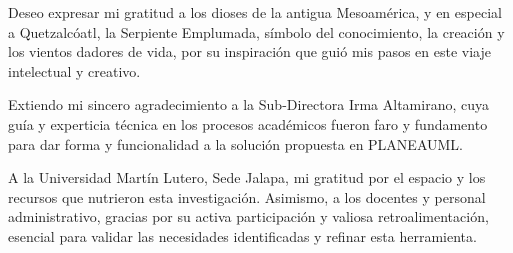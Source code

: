 
Deseo expresar mi gratitud a los dioses de la antigua Mesoamérica, y en especial a Quetzalcóatl, la Serpiente Emplumada, símbolo del conocimiento, la creación y los vientos dadores de vida, por su inspiración que guió mis pasos en este viaje intelectual y creativo.

Extiendo mi sincero agradecimiento a la Sub-Directora Irma Altamirano, cuya guía y experticia técnica en los procesos académicos fueron faro y fundamento para dar forma y funcionalidad a la solución propuesta en PLANEAUML.

A la Universidad Martín Lutero, Sede Jalapa, mi gratitud por el espacio y los recursos que nutrieron esta investigación. Asimismo, a los docentes y personal administrativo, gracias por su activa participación y valiosa retroalimentación, esencial para validar las necesidades identificadas y refinar esta herramienta.
